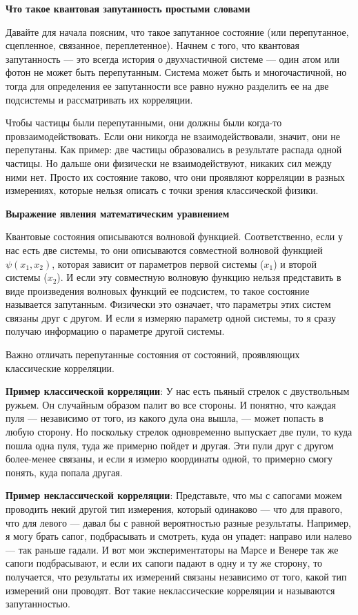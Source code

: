 \documentclass[a4paper, 12pt]{article}%
\begin{document}
\textbf{Что такое квантовая запутанность простыми словами}

 Давайте для начала поясним, что такое запутанное состояние (или перепутанное, сцепленное, связанное, переплетенное). Начнем с того, что квантовая запутанность — это всегда история о двухчастичной системе — один атом или фотон не может быть перепутанным. Система может быть и многочастичной, но тогда для определения ее запутанности все равно нужно разделить ее на две подсистемы и рассматривать их корреляции.
 
 Чтобы частицы были перепутанными, они должны были когда-то провзаимодействовать. Если они никогда не взаимодействовали, значит, они не перепутаны. Как пример: две частицы образовались в результате распада одной частицы. Но дальше они физически не взаимодействуют, никаких сил между ними нет. Просто их состояние таково, что они проявляют корреляции в разных измерениях, которые нельзя описать с точки зрения классической физики.

\textbf{Выражение явления математическим уравнением}

Квантовые состояния описываются волновой функцией. Соответственно, если у нас есть две системы, то они описываются совместной волновой функцией $\psi(x_1, x_2)$, которая зависит от параметров первой системы ($x_1$) и второй системы ($x_2$). И если эту совместную волновую функцию нельзя представить в виде произведения волновых функций ее подсистем, то такое состояние называется запутанным. Физически это означает, что параметры этих систем связаны друг с другом. И если я измеряю параметр одной системы, то я сразу получаю информацию о параметре другой системы.

Важно отличать перепутанные состояния от состояний, проявляющих классические корреляции.

\textbf{Пример классической корреляции}: 
У нас есть пьяный стрелок с двуствольным ружьем. Он случайным образом палит во все стороны. И понятно, что каждая пуля — независимо от того, из какого дула она вышла, — может попасть в любую сторону. Но поскольку стрелок одновременно выпускает две пули, то куда пошла одна пуля, туда же примерно пойдет и другая. Эти пули друг с другом более-менее связаны, и если я измерю координаты одной, то примерно смогу понять, куда попала другая.

\textbf{Пример неклассической корреляции}:
Представьте, что мы с сапогами можем проводить некий другой тип измерения, который одинаково — что для правого, что для левого — давал бы с равной вероятностью разные результаты. Например, я могу брать сапог, подбрасывать и смотреть, куда он упадет: направо или налево — так раньше гадали. И вот мои экспериментаторы на Марсе и Венере так же сапоги подбрасывают, и если их сапоги падают в одну и ту же сторону, то получается, что результаты их измерений связаны независимо от того, какой тип измерений они проводят. Вот такие неклассические корреляции и называются запутанностью.
\end{document}
